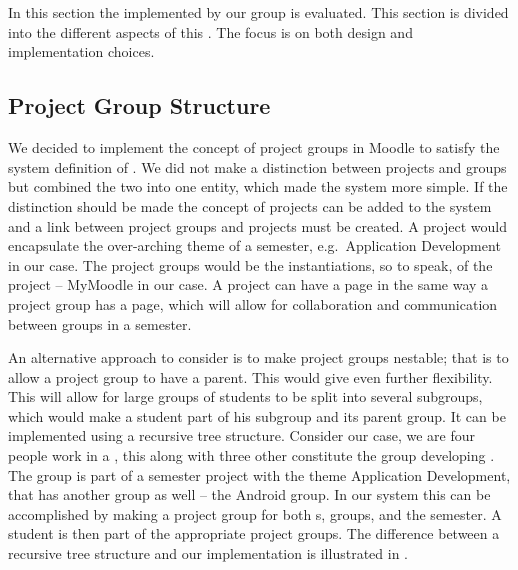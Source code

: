 \section{\administrationgroup{}}
In this section the \subsystem{} implemented by our group is evaluated. 
This section is divided into the different aspects of this \subsystem{}.
The focus is on both design and implementation choices.

\subsection{Project Group Structure}
We decided to implement the concept of project groups in Moodle to satisfy the system definition of \system{}.
We did not make a distinction between projects and groups but combined the two into one entity, which made the system more simple. 
If the distinction should be made the concept of projects can be added to the system and a link between project groups and projects must be created.
A project would encapsulate the over-arching theme of a semester, e.g.\ Application Development in our case.
The project groups would be the instantiations, so to speak, of the project -- MyMoodle in our case.
A project can have a page in the same way a project group has a page, which will allow for collaboration and communication between groups in a semester. 

An alternative approach to consider is to make project groups nestable; that is to allow a project group to have a parent.
This would give even further flexibility.
This will allow for large groups of students to be split into several subgroups, which would make a student part of his subgroup and its parent group.
It can be implemented using a recursive tree structure.
Consider our case, we are four people work in a \subgroup{}, this \subgroup{} along with three other constitute the group developing \system{}.
The \system{} group is part of a semester project with the theme Application Development, that has another group as well -- the Android group.
In our system this can be accomplished by making a project group for both \subgroup{}s, groups, and the semester.
A student is then part of the appropriate project groups.
The difference between a recursive tree structure and our implementation is illustrated in .


